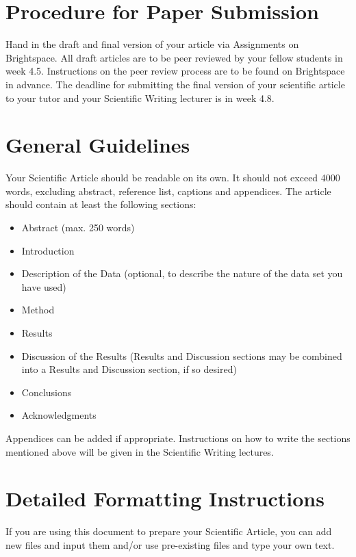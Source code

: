 \section{Procedure for Paper Submission}

Hand in the draft and final version of your article via Assignments on Brightspace. All draft articles are to be peer reviewed by your fellow students in week 4.5. Instructions on the peer review process are to be found on Brightspace in advance.
The deadline for submitting the final version of your scientific article to your tutor and your Scientific Writing lecturer is in week 4.8.

\section{General Guidelines}

Your Scientific Article should be readable on its own. It should not exceed 4000 words, excluding abstract, reference list, captions and appendices. The article should contain at least the following sections:

\begin{itemize}
    \item  Abstract (max. 250 words)
    \item  Introduction
    \item  Description of the Data (optional, to describe the nature of the data set you have used)
    \item  Method
    \item  Results
    \item  Discussion of the Results (Results and Discussion sections may be combined into a Results and Discussion section, if so desired)
    \item  Conclusions
    \item  Acknowledgments
\end{itemize}

\noindent Appendices can be added if appropriate. Instructions on how to write the sections mentioned above will be given in the Scientific Writing lectures.

\section{Detailed Formatting Instructions}

If you are using this document to prepare your Scientific Article, you can add new files and input them and/or use pre-existing files and type your own text.

